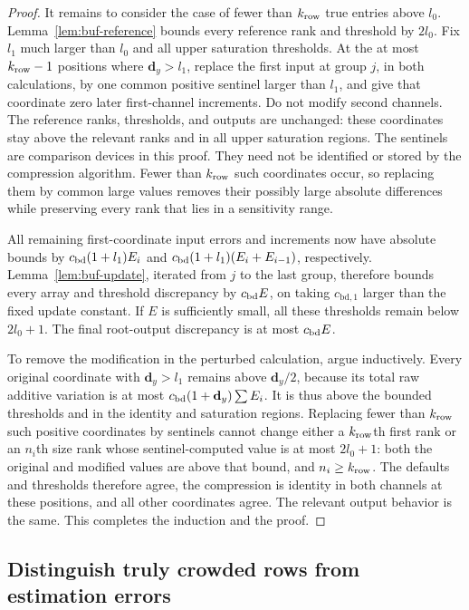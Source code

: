 \documentclass[11pt]{article}
\numberwithin{equation}{section}
\theoremstyle{definition}
\theoremstyle{remark}
\begin{document}
\begin{proof}
It remains to consider the case of fewer than ${k_{\rm row}}$ true entries above
${l}_0$.  Lemma~\ref{lem:buf-reference} bounds every reference rank and
threshold by $2{l}_0$.  Fix ${l}_1$ much larger than ${l}_0$ and all upper
saturation thresholds.  At the at most ${k_{\rm row}}-1$ positions where ${\mathbf{d}}_y>{l}_1$,
replace the first input at group $j$, in both calculations, by one common
positive sentinel larger than ${l}_1$, and give that coordinate zero later
first-channel increments.  Do not modify second channels.
The reference ranks, thresholds, and outputs are unchanged: these
coordinates stay above the relevant ranks and in all upper saturation
regions.
The sentinels are comparison devices in this proof.  They need not be
identified or stored by the compression algorithm.  Fewer than ${k_{\rm row}}$ such
coordinates occur, so replacing them by common large values removes
their possibly large absolute differences while preserving every rank
that lies in a sensitivity range.

All remaining first-coordinate input errors and increments now have
absolute bounds by ${c_{\rm bd}}(1+{l}_1){E_i}$ and
${c_{\rm bd}}(1+{l}_1)({E_i}+{E_{i-1}})$, respectively.  Lemma~\ref{lem:buf-update},
iterated from $j$ to the last group, therefore bounds every array and
threshold discrepancy by ${c_{\rm bd}}E$, on taking ${c_{\mathrm{bd},1}}$ larger than the fixed
update constant.  If $E$ is sufficiently small, all these thresholds
remain below $2{l}_0+1$.  The final root-output discrepancy is at most ${c_{\rm bd}}E$.

To remove the modification in the perturbed calculation, argue inductively.
Every original coordinate with ${\mathbf{d}}_y>{l}_1$ remains above ${\mathbf{d}}_y/2$, because
its total raw additive variation is at most ${c_{\rm bd}}(1+{\mathbf{d}}_y)\sum {E_i}$.
It is thus above the bounded thresholds and in the identity and saturation
regions.  Replacing fewer than ${k_{\rm row}}$ such positive coordinates by sentinels
cannot change either a ${k_{\rm row}}$th first rank or an $n_i$th size rank whose
sentinel-computed value is at most $2{l}_0+1$: both the original and modified
values are above that bound, and $n_i\geq {k_{\rm row}}$.
The defaults and thresholds therefore agree, the compression is identity
in both channels at these positions, and all other coordinates agree.
The relevant output behavior is the same.  This completes the induction
and the proof.
\end{proof}

\subsection{Distinguish truly crowded rows from estimation errors}
\end{document}

